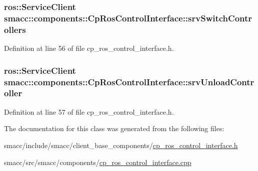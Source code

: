 \subsubsection[{\texorpdfstring{srv\+Switch\+Controllers}{srvSwitchControllers}}]{\setlength{\rightskip}{0pt plus 5cm}ros\+::\+Service\+Client smacc\+::components\+::\+Cp\+Ros\+Control\+Interface\+::srv\+Switch\+Controllers\hspace{0.3cm}{\ttfamily [private]}}\hypertarget{classsmacc_1_1components_1_1CpRosControlInterface_a78e45e68567c23ca5c19df0de257c20f}{}\label{classsmacc_1_1components_1_1CpRosControlInterface_a78e45e68567c23ca5c19df0de257c20f}


Definition at line 56 of file cp\+\_\+ros\+\_\+control\+\_\+interface.\+h.

\subsubsection[{\texorpdfstring{srv\+Unload\+Controller}{srvUnloadController}}]{\setlength{\rightskip}{0pt plus 5cm}ros\+::\+Service\+Client smacc\+::components\+::\+Cp\+Ros\+Control\+Interface\+::srv\+Unload\+Controller\hspace{0.3cm}{\ttfamily [private]}}\hypertarget{classsmacc_1_1components_1_1CpRosControlInterface_a0515a2a86bfcd0fdec08fabd3070723c}{}\label{classsmacc_1_1components_1_1CpRosControlInterface_a0515a2a86bfcd0fdec08fabd3070723c}


Definition at line 57 of file cp\+\_\+ros\+\_\+control\+\_\+interface.\+h.



The documentation for this class was generated from the following files\+:\begin{DoxyCompactItemize}
\item 
smacc/include/smacc/client\+\_\+base\+\_\+components/\hyperlink{cp__ros__control__interface_8h}{cp\+\_\+ros\+\_\+control\+\_\+interface.\+h}\item 
smacc/src/smacc/components/\hyperlink{cp__ros__control__interface_8cpp}{cp\+\_\+ros\+\_\+control\+\_\+interface.\+cpp}\end{DoxyCompactItemize}

